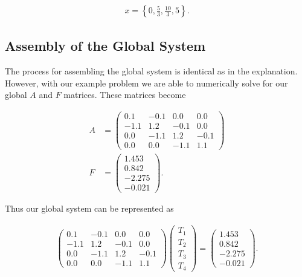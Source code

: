 \documentclass[10pt]{amsart}
\numberwithin{equation}{section}
\theoremstyle{definition}
\begin{document}
\begin{multicols}{2}
\begin{align*}
  x = \left\{0, \frac{5}{3}, \frac{10}{3}, 5\right\}.
\end{align*}

\subsection{Assembly of the Global System}%
\label{sub:assembly_of_the_global_system}

The process for assembling the global system is identical as in the
explanation. However, with our example problem we are able to numerically solve
for our global $A$ and $F$ matrices. These matrices become

\begin{align*}
  A&=\begin{pmatrix}
    0.1 & -0.1 & 0.0 & 0.0 \\
    -1.1 & 1.2 & -0.1 & 0.0 \\
    0.0 & -1.1 & 1.2 & -0.1 \\
    0.0  & 0.0 & -1.1 & 1.1
  \end{pmatrix}\\
  F&=\begin{pmatrix}
    1.453 \\ 0.842 \\ -2.275 \\ -0.021
  \end{pmatrix}.
\end{align*}

Thus our global system can be represented as

\begin{align*}
  \begin{pmatrix}
    0.1 & -0.1 & 0.0 & 0.0 \\
    -1.1 & 1.2 & -0.1 & 0.0 \\
    0.0 & -1.1 & 1.2 & -0.1 \\
    0.0  & 0.0 & -1.1 & 1.1
  \end{pmatrix}
  \begin{pmatrix}
    T_1 \\ T_2 \\ T_3 \\ T_4
  \end{pmatrix}
  =
  \begin{pmatrix}
    1.453 \\ 0.842 \\ -2.275 \\ -0.021
  \end{pmatrix}.
\end{align*}


\end{multicols}
\end{document}
